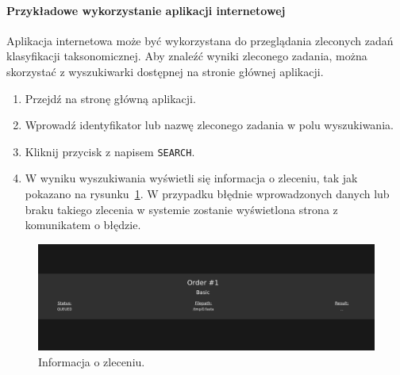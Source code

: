             \paragraph{Przykładowe wykorzystanie aplikacji internetowej}

                Aplikacja internetowa może być wykorzystana do przeglądania zleconych zadań klasyfikacji taksonomicznej. Aby znaleźć wyniki zleconego zadania, można skorzystać z wyszukiwarki dostępnej na stronie głównej aplikacji.

                \begin{enumerate}
                    \item {
                        Przejdź na stronę główną aplikacji.
                    }
                    \item {
                        Wprowadź identyfikator lub nazwę zleconego zadania w polu wyszukiwania.
                    }
                    \item {
                        Kliknij przycisk z napisem \texttt{SEARCH}.
                    }
                    \item {
                        W wyniku wyszukiwania wyświetli się informacja o zleceniu, tak jak pokazano na rysunku~\ref{Picture:App:WebSearchSuccess}. W przypadku błędnie wprowadzonych danych lub braku takiego zlecenia w systemie zostanie wyświetlona strona z komunikatem o błędzie.
                    }
                \end{enumerate}

                \begin{figure}[!htb]
                    \begin{center}
                        \includegraphics[width=\textwidth]{tex/pictures/app/web_search_success.png}
                    \end{center}
                    \caption{
                        Informacja o zleceniu.
                    }\label{Picture:App:WebSearchSuccess}
                \end{figure}

